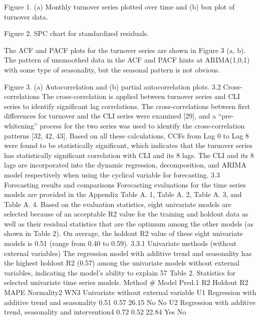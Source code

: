 Figure 1. (a) Monthly turnover series plotted over time and (b) box plot of turnover data.
 
Figure 2. SPC chart for standardized residuals.

The ACF and PACF plots for the turnover series are shown in Figure 3 (a, b). The pattern of unsmoothed data in the ACF and PACF hints at ARIMA(1,0,1) with some type of seasonality, but the seasonal pattern is not obvious.
 
Figure 3. (a) Autocorrelation and (b) partial autocorrelation plots.
3.2    Cross-correlations 
The cross-correlation is applied between turnover series and CLI series to identify significant lag correlations. The cross-correlations between first differences for turnover and the CLI series were examined [29], and a “pre-whitening” process for the two series was used to identify the cross-correlation patterns [32, 42, 43]. Based on all these calculations, CCFs from Lag 0 to Lag 8 were found to be statistically significant, which indicates that the turnover series has statistically significant correlation with CLI and its 8 lags. The CLI and its 8 lags are incorporated into the dynamic regression, decomposition, and ARIMA model respectively when using the cyclical variable for forecasting.  
3.3    Forecasting results and comparisons
Forecasting evaluations for the time series models are provided in the Appendix Table A. 1, Table A. 2, Table A. 3, and Table A. 4. Based on the evaluation statistics, eight univariate models are selected because of an acceptable R2 value for the training and holdout data as well as their residual statistics that are the optimum among the other models (as shown in Table 2).  On average, the holdout R2 value of these eight univariate models is 0.51 (range from 0.40 to 0.59). 
3.3.1    Univariate methods (without external variables)
The regression model with additive trend and seasonality has the highest holdout R2 (0.57) among the univariate models without external variables, indicating the model’s ability to explain 57%
Table 2. Statistics for selected univariate time series models.
Method	#	Model	Pred.1 R2	Holdout R2	MAPE	Normality2	WN3
Univariate without external variable 	U1	Regression with additive trend and seasonality	0.51	0.57	26.15	No	No
	U2	Regression with additive trend, seasonality and intervention4 	0.72	0.52	22.84	Yes	No
